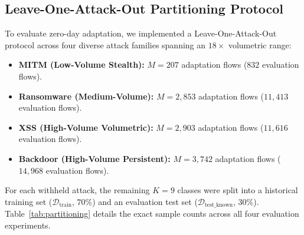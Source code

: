 \documentclass[conference]{IEEEtran}
\begin{document}
\subsection{Leave-One-Attack-Out Partitioning Protocol}
To evaluate zero-day adaptation, we implemented a Leave-One-Attack-Out protocol across four diverse attack families spanning an $18\times$ volumetric range:
\begin{itemize}
    \item \textbf{MITM (Low-Volume Stealth):} $M = 207$ adaptation flows ($832$ evaluation flows).
    \item \textbf{Ransomware (Medium-Volume):} $M = 2{,}853$ adaptation flows ($11{,}413$ evaluation flows).
    \item \textbf{XSS (High-Volume Volumetric):} $M = 2{,}903$ adaptation flows ($11{,}616$ evaluation flows).
    \item \textbf{Backdoor (High-Volume Persistent):} $M = 3{,}742$ adaptation flows ($14{,}968$ evaluation flows).
\end{itemize}
For each withheld attack, the remaining $K=9$ classes were split into a historical training set ($\mathcal{D}_{\text{train}}$, $70\%$) and an evaluation test set ($\mathcal{D}_{\text{test\_known}}$, $30\%$). Table~\ref{tab:partitioning} details the exact sample counts across all four evaluation experiments.

\begin{table}[htbp]
\centering
\caption{Dataset partitioning and sample counts across the four leave-one-attack-out experiments.}
\label{tab:partitioning}
\end{table}
\end{document}
